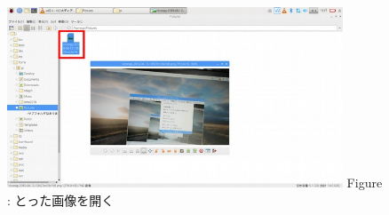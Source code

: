 \documentclass[a4paper,12pt]{jarticle}
\begin{document}
\begin{figure}
  \centering
  \begin{minipage}{10cm}
    {\upshape
      \includegraphics[width=10cm]{textbook-img122.jpg}
      \newline
      Figure {\theFigure\label{seq:refFigure28}}:
      とった画像を開く}
  \end{minipage}
\end{figure}

\bigskip

\clearpage
\end{document}
